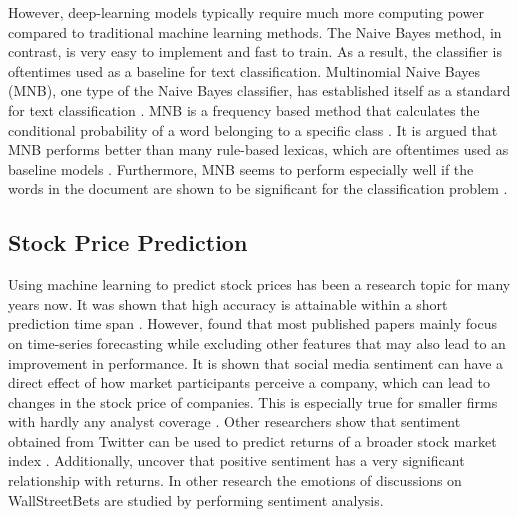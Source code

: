 \documentclass[11pt, a4paper]{article}
\begin{document}
However, deep-learning models typically
require much more computing power compared to traditional machine learning methods. The Naive Bayes method, in contrast, is very easy to implement and fast to train. As a
result, the classifier is oftentimes used as a baseline for text classification. Multinomial Naive Bayes (MNB), one type of the Naive Bayes classifier, has established
itself as a standard for text classification \citep{abbas2019mnb}. MNB is a frequency based method that calculates the conditional probability of a word
belonging to a specific class \citep{susanti2017sentiment}. %
It is argued that MNB performs better than many rule-based lexicas, which are oftentimes
used as baseline models \citep{wang2012NB}. Furthermore, MNB seems to perform especially well if the words in the document are shown to be significant for the
classification problem \citep{omar2019conference}.


\subsection{Stock Price Prediction}

Using machine learning to predict stock prices has been a research topic for many years now. It was shown that high accuracy is attainable within
a short prediction time span \citep{schoneburg1990prediction}. However, \cite{gooijer2006forecasting} found that most published papers mainly focus on time-series forecasting while excluding other features
that may also lead to an improvement in performance.
It is shown that social media sentiment can have a 
direct effect of how market participants perceive a company, which can lead to changes in the stock price of companies. This is especially true for smaller 
firms with hardly any analyst coverage \citep{feng2019824}. Other researchers show that sentiment obtained from Twitter can be used to predict returns of a 
broader stock market index \citep{gu2020twtrsentiment}.
Additionally, \cite{werner2004talknoise} uncover that positive sentiment has a very significant relationship with returns.
In other research the emotions of discussions on WallStreetBets are studied by performing sentiment analysis. 
\end{document}

